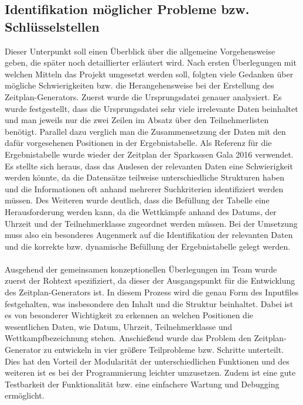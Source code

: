 {\subsection{Identifikation möglicher Probleme bzw. Schlüsselstellen}

Dieser Unterpunkt soll einen Überblick über die allgemeine Vorgehensweise geben, die später noch detaillierter erläutert wird. Nach ersten Überlegungen mit welchen Mitteln das Projekt umgesetzt werden soll, folgten viele Gedanken über mögliche Schwierigkeiten bzw. die Herangehensweise bei der Erstellung des Zeitplan-Generators. Zuerst wurde die Ursprungsdatei genauer analysiert. Es wurde festgestellt, dass die Ursprungsdatei sehr viele irrelevante Daten beinhaltet und man jeweils nur die zwei Zeilen im Absatz über den Teilnehmerlisten benötigt. Parallel dazu verglich man die Zusammensetzung der Daten mit den dafür vorgesehenen Positionen in der Ergebnistabelle. Als Referenz für die Ergebnistabelle wurde wieder der Zeitplan der Sparkassen Gala 2016 verwendet. Es stellte sich heraus, dass das Auslesen der relevanten Daten eine Schwierigkeit werden könnte, da die Datensätze teilweise unterschiedliche Strukturen haben und die Informationen oft anhand mehrerer Suchkriterien identifiziert werden müssen. Des Weiteren wurde deutlich, dass die Befüllung der Tabelle eine Herausforderung werden kann, da die Wettkämpfe anhand des Datums, der Uhrzeit und der Teilnehmerklasse zugeordnet werden müssen. Bei der Umsetzung muss also ein besonderes Augenmerk auf die Identifikation der relevanten Daten und die korrekte bzw. dynamische Befüllung der Ergebnistabelle gelegt werden. \\
\\
Ausgehend der gemeinsamen konzeptionellen Überlegungen im Team wurde zuerst der Rohtext spezifiziert, da dieser der Ausgangspunkt für die Entwicklung des Zeitplan-Generators ist. In diesem Prozess wird die genau Form des Inputfiles festgehalten, was insbesondere den Inhalt und die Struktur beinhaltet. Dabei ist es von besonderer Wichtigkeit zu erkennen an welchen Positionen die wesentlichen Daten, wie Datum, Uhrzeit, Teilnehmerklasse und Wettkampfbezeichnung stehen. 
Anschießend wurde das Problem den Zeitplan-Generator zu entwickeln in vier größere Teilprobleme bzw. Schritte unterteilt. Dies hat den Vorteil der Modularität der unterschiedlichen Funktionen und des weiteren ist es bei der Programmierung leichter umzusetzen. Zudem ist eine gute Testbarkeit der Funktionalität bzw. eine einfachere Wartung  und Debugging ermöglicht. 
}
